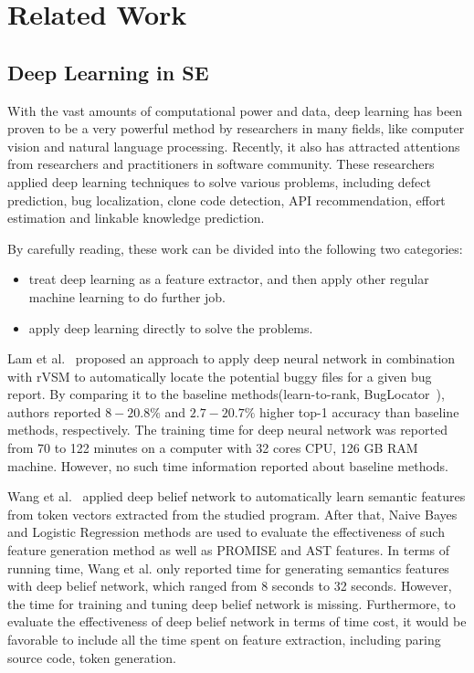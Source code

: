 \section{Related Work}


\subsection{Deep Learning in SE}
With the vast amounts of computational power and data, 
deep learning has been proven to be a very powerful method 
by researchers in many fields\cite{lecun2015deep}, like computer vision and natural language processing\cite{krizhevsky2012imagenet,mikolov2013distributed,sutskever2014sequence}. 
Recently, it also has attracted  attentions from researchers and practitioners in software
 community\cite{wang2016automatically, gu2016deep, xu2016predicting,white2016deep,white2015toward,lam2015combining,choetkiertikul2016deep}.
 These researchers applied  deep learning techniques to solve various problems,
 including defect prediction, bug localization, clone code detection, API recommendation, 
 effort estimation and linkable knowledge prediction.
 
By carefully reading, these work can be divided into the following two categories:
 
\begin{itemize}
\item treat deep learning as a feature extractor, and then apply other regular machine learning to do further job.
\item apply deep learning directly to solve the problems.
\end{itemize}

Lam et al.~\cite{lam2015combining}  proposed an approach to apply deep neural network
 in combination with rVSM to automatically locate the potential buggy files for a given
 bug report. By comparing it to the baseline methods(learn-to-rank\cite{ye2014learning}, 
 BugLocator~\cite{zhou2012should}), authors reported $8-20.8\%$  and $2.7-20.7\%$ 
 higher top-1 accuracy than baseline methods, respectively. The training time for deep neural
 network was reported from 70 to 122 minutes on a computer with 32 cores CPU,
 126 GB RAM machine. However,
 no such time information reported about baseline methods.
 
 Wang et al.~\cite{wang2016automatically} applied deep belief network to automatically
 learn semantic features from token vectors extracted from the studied program. After
 that, Naive Bayes and Logistic Regression methods are used to evaluate the effectiveness
 of such feature generation method as well as PROMISE and AST features. In terms of
 running time, Wang et al. only reported time for generating semantics features with deep belief network, which
 ranged from 8 seconds to 32 seconds. However, the time for training and tuning deep belief network is
 missing. Furthermore, to evaluate the effectiveness of deep belief network in terms of time cost, 
 it would be favorable to include all the time spent on feature extraction, including
 paring source code, token generation.
 
